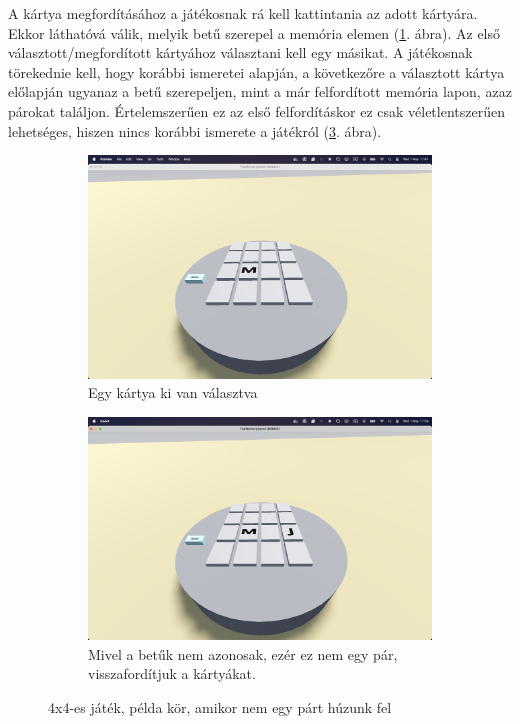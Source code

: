 A kártya megfordításához a játékosnak rá kell kattintania az adott kártyára. 
Ekkor láthatóvá válik, melyik betű szerepel a memória elemen (\ref{img:kartya_fliped}. ábra). 
Az első választott/megfordított kártyához választani kell egy másikat. A játékosnak törekednie kell, hogy korábbi ismeretei alapján, a következőre a választott kártya előlapján ugyanaz a betű szerepeljen, mint a már felfordított memória lapon, azaz párokat találjon.
Értelemszerűen ez az első felfordításkor ez csak véletlentszerűen lehetséges, hiszen nincs korábbi ismerete a játékról (\ref{img:non_pair}. ábra).
\begin{figure}[h]
\begin{subfigure}[t]{0.5\textwidth}
    \includegraphics[width=\linewidth]{img/asztal_4x4_card_flipped.png}
    \caption{Egy kártya ki van választva}
    \label{img:kartya_fliped}
\end{subfigure}
\begin{subfigure}[t]{0.5\textwidth}
    \includegraphics[width=\linewidth]{img/asztal_4x4_non_pair.png}
    \caption{Mivel a betűk nem azonosak, ezér ez nem egy pár, visszafordítjuk a kártyákat.}
    \label{img:non_pair}
\end{subfigure}
\caption{4x4-es játék, példa kör, amikor nem egy párt húzunk fel}
\end{figure}
